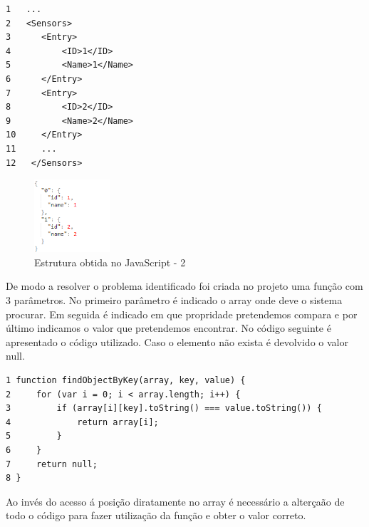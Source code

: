 \begin{verbatim}
1   ...
2   <Sensors>
3      <Entry>
4          <ID>1</ID>
5          <Name>1</Name>
6      </Entry>
7      <Entry>
8          <ID>2</ID>
9          <Name>2</Name>
10     </Entry>
11     ...
12   </Sensors>

 \end{verbatim}

 \begin{figure}[ht]
\centering
\includegraphics[width=0.25\textwidth]{images/estruct2.png}
\caption{Estrutura obtida no JavaScript - 2}\label{estruct2}
\end{figure}


\par De modo a resolver o problema identificado foi criada no projeto uma função com 3 parâmetros. No primeiro parâmetro é indicado o array onde deve o sistema procurar. Em seguida é indicado em que propridade pretendemos compara e por último indicamos o valor que pretendemos encontrar. No código seguinte é apresentado o código utilizado. Caso o elemento não exista é devolvido o valor null.
 \begin{verbatim}
1 function findObjectByKey(array, key, value) {
2     for (var i = 0; i < array.length; i++) {
3         if (array[i][key].toString() === value.toString()) {
4             return array[i];
5         }
6     }
7     return null;
8 }
 \end{verbatim}

\par Ao invés do acesso á posição diratamente no array é necessário a alterçaão de todo o código para fazer utilização da função e obter o valor correto.
